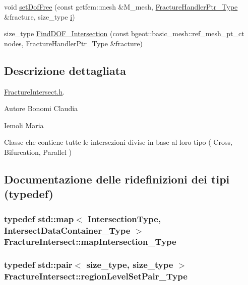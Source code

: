 \begin{DoxyCompactItemize}
\item 
void \hyperlink{classFractureIntersect_a5290dda06af2f6ba24a37f93d3bb4e95}{set\-Dof\-Free} (const getfem\-::mesh \&M\-\_\-mesh, \hyperlink{FractureHandler_8h_af23fb7a30aaff864bd42587af4f1e78a}{Fracture\-Handler\-Ptr\-\_\-\-Type} \&fracture, size\-\_\-type \hyperlink{matrici_8m_a6f6ccfcf58b31cb6412107d9d5281426}{i})
\item 
size\-\_\-type \hyperlink{classFractureIntersect_a0d63690aff97bc6a98f7e01d9d319f1c}{Find\-D\-O\-F\-\_\-\-Intersection} (const bgeot\-::basic\-\_\-mesh\-::ref\-\_\-mesh\-\_\-pt\-\_\-ct nodes, \hyperlink{FractureHandler_8h_af23fb7a30aaff864bd42587af4f1e78a}{Fracture\-Handler\-Ptr\-\_\-\-Type} \&fracture)
\end{DoxyCompactItemize}


\subsection{Descrizione dettagliata}
\hyperlink{FractureIntersect_8h}{Fracture\-Intersect.\-h}. 

\begin{DoxyAuthor}{Autore}
Bonomi Claudia

Iemoli Maria
\end{DoxyAuthor}
Classe che contiene tutte le intersezioni divise in base al loro tipo ( Cross, Bifurcation, Parallel ) 

\subsection{Documentazione delle ridefinizioni dei tipi (typedef)}
\hypertarget{classFractureIntersect_a4eea7d0aca48cdd36ea1756e75280332}{
\subsubsection[{map\-Intersection\-\_\-\-Type}]{\setlength{\rightskip}{0pt plus 5cm}typedef std\-::map$<$ {\bf Intersection\-Type}, {\bf Intersect\-Data\-Container\-\_\-\-Type} $>$ {\bf Fracture\-Intersect\-::map\-Intersection\-\_\-\-Type}}}\label{classFractureIntersect_a4eea7d0aca48cdd36ea1756e75280332}
\hypertarget{classFractureIntersect_aea039e89cb4b4314c25c7a362641f40e}{
\subsubsection[{region\-Level\-Set\-Pair\-\_\-\-Type}]{\setlength{\rightskip}{0pt plus 5cm}typedef std\-::pair$<$ size\-\_\-type, size\-\_\-type $>$ {\bf Fracture\-Intersect\-::region\-Level\-Set\-Pair\-\_\-\-Type}}}\label{classFractureIntersect_aea039e89cb4b4314c25c7a362641f40e}



